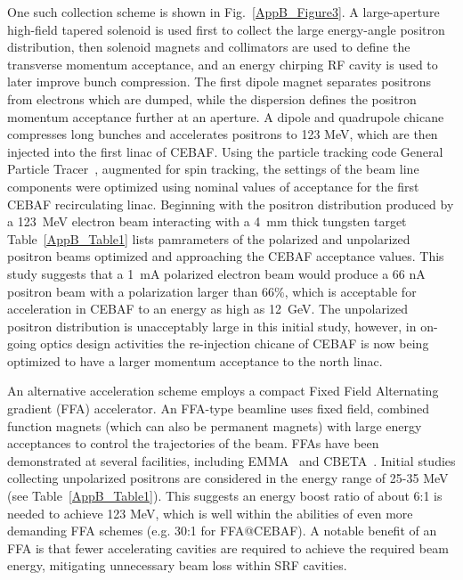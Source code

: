 One such collection scheme is shown in Fig.~\ref{AppB_Figure3}.  A large-aperture high-field tapered solenoid is used first to collect the large energy-angle positron distribution, then solenoid magnets and collimators are used to define the transverse momentum acceptance, and an energy chirping RF cavity is used to later improve bunch compression. The first dipole magnet separates positrons from electrons which are dumped, while the dispersion defines the positron momentum acceptance further at an aperture. A dipole and quadrupole chicane compresses long bunches and accelerates positrons to 123 MeV, which are then injected into the first linac of CEBAF. Using the particle tracking code General Particle Tracer~\cite{Proceedings:Stefani2021}, augmented for spin tracking, the settings of the beam line components were optimized using nominal values of acceptance for the first CEBAF recirculating linac.   Beginning with the positron distribution produced by a 123~MeV electron beam interacting with a 4~mm thick tungsten target  Table~\ref{AppB_Table1} lists pamrameters of the  polarized and unpolarized positron beams optimized and approaching the CEBAF acceptance values.   This study suggests that a 1~mA polarized electron beam would produce a 66 nA positron beam with a polarization larger than 66\%, which is acceptable for acceleration in CEBAF to an energy as high as 12~GeV.   The unpolarized positron distribution is unacceptably large in this initial study, however, in on-going optics design activities the re-injection chicane of CEBAF is now being optimized to have a larger momentum acceptance to the north linac.

An alternative acceleration scheme employs a compact Fixed Field Alternating gradient (FFA) accelerator. An FFA-type beamline uses fixed field, combined function magnets (which can also be permanent magnets) with large energy acceptances to control the trajectories of the beam. FFAs have been demonstrated at several facilities, including EMMA~\cite{EMMA-Pos07} and CBETA~\cite{PhysRevLett.125.044803}. Initial studies collecting unpolarized positrons are considered in the energy range of 25-35 MeV (see Table~\ref{AppB_Table1}). This suggests an energy boost ratio of about 6:1 is needed to achieve 123 MeV, which is well within the abilities of even more demanding FFA schemes (e.g. 30:1 for FFA@CEBAF). A notable benefit of an FFA is that fewer accelerating cavities are required to achieve the required beam energy, mitigating unnecessary beam loss within SRF cavities.


